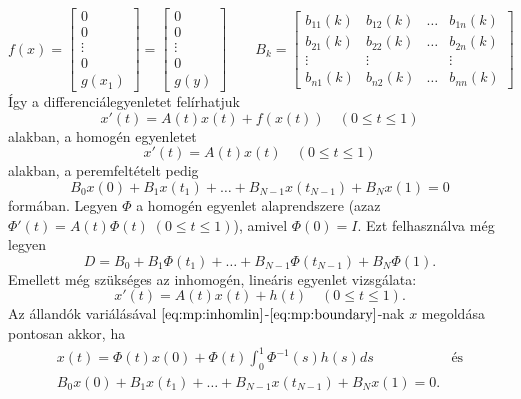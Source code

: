 \documentclass[oneside, titlepage, 12pt, a4paper]{report}
\begin{document}
\begin{equation*}
f(x) =
	\begin{bmatrix}
		0 \\ 0 \\ \vdots \\ 0 \\ g(x_1)
	\end{bmatrix}
=
	\begin{bmatrix}
		0 \\ 0 \\ \vdots \\ 0 \\ g(y)
	\end{bmatrix}
\qquad
B_k =
	\begin{bmatrix}
		b_{11}(k) & b_{12}(k) & \dots & b_{1n}(k) \\
		b_{21}(k) & b_{22}(k) & \dots & b_{2n}(k) \\
		\vdots & \vdots && \vdots \\
		b_{n1}(k) & b_{n2}(k) & \dots & b_{nn}(k)
	\end{bmatrix}
\end{equation*}
Így a differenciálegyenletet felírhatjuk 
\begin{equation}
x'(t) = A(t) x(t) + f(x(t)) \quad (0 \leq t \leq 1) \label{eq:mp:inhom}
\end{equation}
alakban, a homogén egyenletet
\begin{equation}
x'(t) = A(t) x(t) \quad (0 \leq t \leq 1) \label{eq:mp:hom}
\end{equation}
alakban, a peremfeltételt pedig
\begin{equation}
B_0 x(0) + B_1 x(t_1) + \dots + B_{N-1} x(t_{N-1}) + B_N x(1) = 0 \label{eq:mp:boundary}
\end{equation}
formában. Legyen $\Phi$ a homogén egyenlet alaprendszere (azaz $\Phi'(t) = A(t) \Phi(t) \; (0 \leq t \leq 1)$), amivel $\Phi(0) = I$. Ezt felhasználva még legyen
\begin{equation*}
D = B_0 + B_1 \Phi(t_1) + \dots + B_{N-1} \Phi(t_{N-1}) + B_N \Phi(1).
\end{equation*}
Emellett még szükséges az inhomogén, lineáris egyenlet vizsgálata:
\begin{equation}
x'(t) = A(t) x(t) + h(t) \quad (0 \leq t \leq 1). \label{eq:mp:inhomlin}
\end{equation}
Az állandók variálásával $\eqref{eq:mp:inhomlin}$-$\eqref{eq:mp:boundary}$-nak $x$ megoldása pontosan akkor, ha
\begin{align*}
&x(t) = \Phi(t) x(0) + \Phi(t) \int_0^1 \Phi^{-1}(s) h(s) ds &\text{és}& \\
&B_0 x(0) + B_1 x(t_1) + \dots + B_{N-1} x(t_{N-1}) + B_N x(1) = 0.&&
\end{align*}
\end{document}
